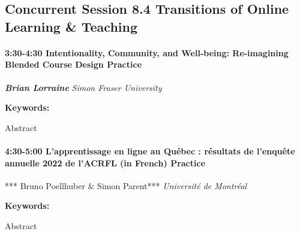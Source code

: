 \documentclass[
]{book}
\begin{document}
\hypertarget{concurrent-session-8.4-transitions-of-online-learning-teaching}{%
\subsection*{Concurrent Session 8.4 \textbar{} Transitions of Online Learning \& Teaching}\label{concurrent-session-8.4-transitions-of-online-learning-teaching}}

\begin{session}
\hypertarget{intentionality-community-and-well-being-re-imagining-blended-course-design-practice}{%
\paragraph*{\texorpdfstring{3:30-4:30 \textbar{} \textbf{Intentionality,
Community, and Well-being: Re-imagining Blended Course Design}
\textbar{}
Practice}{3:30-4:30 \textbar{} Intentionality, Community, and Well-being: Re-imagining Blended Course Design \textbar{} Practice}}\label{intentionality-community-and-well-being-re-imagining-blended-course-design-practice}}

\textbf{\emph{Brian Lorraine}} \textbar{} \emph{Simon Fraser University}

\textbf{Keywords:}

Abstract
\end{session}

\begin{session}
\hypertarget{lapprentissage-en-ligne-au-quuxe9bec-ruxe9sultats-de-lenquuxeate-annuelle-2022-de-lacrfl-in-french-practice}{%
\paragraph*{\texorpdfstring{4:30-5:00 \textbar{} \textbf{L'apprentissage
en ligne au Québec : résultats de l'enquête annuelle 2022 de l'ACRFL (in
French)} \textbar{}
Practice}{4:30-5:00 \textbar{} L'apprentissage en ligne au Québec : résultats de l'enquête annuelle 2022 de l'ACRFL (in French) \textbar{} Practice}}\label{lapprentissage-en-ligne-au-quuxe9bec-ruxe9sultats-de-lenquuxeate-annuelle-2022-de-lacrfl-in-french-practice}}

*** Bruno Poellhuber \& Simon Parent*** \textbar{} \emph{Université de
Montréal}

\textbf{Keywords:}

Abstract
\end{session}
\end{document}
